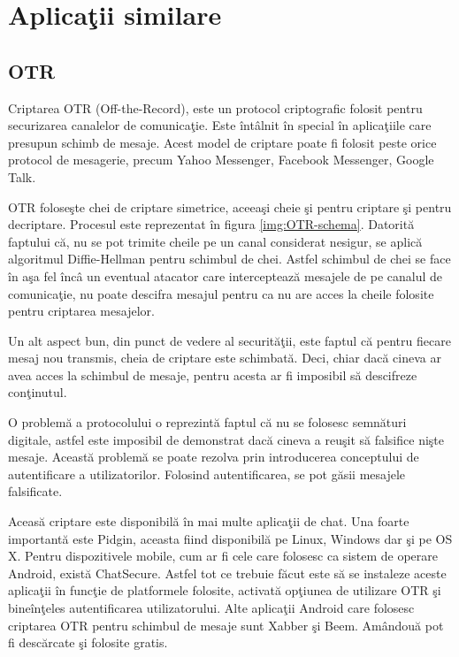 \chapter{Aplica\c{t}ii similare}

\section{OTR}

Criptarea OTR (Off-the-Record), este un protocol criptografic folosit pentru securizarea canalelor de comunica\c{t}ie. Este \^{i}nt\^{a}lnit \^{i}n special \^{i}n aplica\c{t}iile care presupun schimb de mesaje. Acest model de criptare poate fi folosit peste orice protocol de mesagerie, precum Yahoo Messenger, Facebook Messenger, Google Talk. 

OTR folose\c{s}te chei de criptare simetrice, aceea\c{s}i cheie \c{s}i pentru criptare \c{s}i pentru decriptare. Procesul este reprezentat \^{i}n figura \ref{img:OTR-schema}. Datorit\u{a} faptului c\u{a}, nu se pot trimite cheile pe un canal considerat nesigur, se aplic\u{a} algoritmul Diffie-Hellman pentru schimbul de chei. Astfel schimbul de chei se face \^{i}n a\c{s}a fel \^{i}nc\^{a} un eventual atacator care intercepteaz\u{a} mesajele de pe canalul de comunica\c{t}ie, nu poate descifra mesajul pentru ca nu are acces la cheile folosite pentru criptarea mesajelor\cite{Borisov:2004:OCW:1029179.1029200}.


	Un alt aspect bun, din punct de vedere al securit\u{a}\c{t}ii, este faptul c\u{a} pentru fiecare mesaj nou transmis, cheia de criptare este schimbat\u{a}. Deci, chiar dac\u{a} cineva ar avea acces la schimbul de mesaje, pentru acesta ar fi imposibil s\u{a} descifreze con\c{t}inutul.

	O problem\u{a} a protocolului o reprezint\u{a} faptul c\u{a} nu se folosesc semn\u{a}turi digitale, astfel este imposibil de demonstrat dac\u{a} cineva a reu\c{s}it s\u{a} falsifice ni\c{s}te mesaje. Aceast\u{a} problem\u{a} se poate rezolva prin introducerea conceptului de autentificare a utilizatorilor. Folosind autentificarea, se pot g\u{a}sii mesajele falsificate\cite{Borisov:2004:OCW:1029179.1029200}.

	Aceas\u{a} criptare este disponibil\u{a} \^{i}n mai multe aplica\c{t}ii de chat. Una foarte important\u{a} este Pidgin, aceasta fiind disponibil\u{a} pe Linux, Windows dar \c{s}i pe OS X. Pentru dispozitivele mobile, cum ar fi cele care folosesc ca sistem de operare Android, exist\u{a} ChatSecure. Astfel tot ce trebuie f\u{a}cut este s\u{a} se instaleze aceste aplica\c{t}ii \^{i}n func\c{t}ie de platformele folosite, activat\u{a} op\c{t}iunea de utilizare OTR \c{s}i bine\^{i}n\c{t}eles autentificarea utilizatorului. Alte aplica\c{t}ii Android care folosesc criptarea OTR pentru schimbul de mesaje sunt Xabber \c{s}i Beem. Am\^{a}ndou\u{a} pot fi desc\u{a}rcate \c{s}i folosite gratis.


